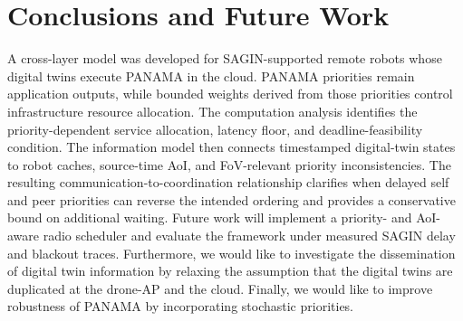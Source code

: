 \IfFileExists{IEEEtran.cls}{\documentclass[conference]{IEEEtran}}{\documentclass[10pt,twocolumn]{article}}
\begin{document}
\section{Conclusions and Future Work}
A cross-layer model was developed for SAGIN-supported remote robots whose digital twins execute PANAMA in the cloud. PANAMA priorities remain application outputs, while bounded weights derived from those priorities control infrastructure resource allocation. The computation analysis identifies the priority-dependent service allocation, latency floor, and deadline-feasibility condition. The information model then connects timestamped digital-twin states to robot caches, source-time AoI, and FoV-relevant priority inconsistencies. The resulting communication-to-coordination relationship clarifies when delayed self and peer priorities can reverse the intended ordering and provides a conservative bound on additional waiting. Future work will implement a priority- and AoI-aware radio scheduler and evaluate the framework under measured SAGIN delay and blackout traces. Furthermore, we would like to investigate the dissemination of digital twin information by relaxing the assumption that the digital twins are duplicated at the drone-AP and the cloud. Finally, we would like to improve robustness of PANAMA by incorporating stochastic priorities.



\end{document}
